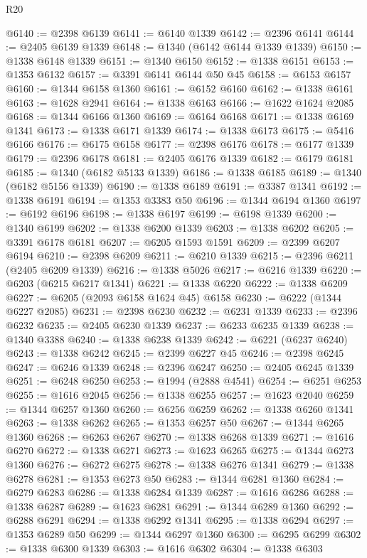 \begin{lexlean}{R20}
\begin{coremodule}
@6140 := @2398 @6139
@6141 := @6140 @1339
@6142 := @2396 @6141
@6144 := @2405 @6139 @1339
@6148 := @1340 (@6142 @6144 @1339 @1339)
@6150 := @1338 @6148 @1339
@6151 := @1340 @6150
@6152 := @1338 @6151
@6153 := @1353 @6132
@6157 := @3391 @6141 @6144 @50 @45
@6158 := @6153 @6157
@6160 := @1344 @6158 @1360
@6161 := @6152 @6160
@6162 := @1338 @6161
@6163 := @1628 @2941
@6164 := @1338 @6163
@6166 := @1622 @1624 @2085
@6168 := @1344 @6166 @1360
@6169 := @6164 @6168
@6171 := @1338 @6169 @1341
@6173 := @1338 @6171 @1339
@6174 := @1338 @6173
@6175 := @5416 @6166
@6176 := @6175 @6158
@6177 := @2398 @6176
@6178 := @6177 @1339
@6179 := @2396 @6178
@6181 := @2405 @6176 @1339
@6182 := @6179 @6181
@6185 := @1340 (@6182 @5133 @1339)
@6186 := @1338 @6185
@6189 := @1340 (@6182 @5156 @1339)
@6190 := @1338 @6189
@6191 := @3387 @1341
@6192 := @1338 @6191
@6194 := @1353 @3383 @50
@6196 := @1344 @6194 @1360
@6197 := @6192 @6196
@6198 := @1338 @6197
@6199 := @6198 @1339
@6200 := @1340 @6199
@6202 := @1338 @6200 @1339
@6203 := @1338 @6202
@6205 := @3391 @6178 @6181
@6207 := @6205 @1593 @1591
@6209 := @2399 @6207 @6194
@6210 := @2398 @6209
@6211 := @6210 @1339
@6215 := @2396 @6211 (@2405 @6209 @1339)
@6216 := @1338 @5026
@6217 := @6216 @1339
@6220 := @6203 (@6215 @6217 @1341)
@6221 := @1338 @6220
@6222 := @1338 @6209
@6227 := @6205 (@2093 @6158 @1624 @45) @6158
@6230 := @6222 (@1344 @6227 @2085)
@6231 := @2398 @6230
@6232 := @6231 @1339
@6233 := @2396 @6232
@6235 := @2405 @6230 @1339
@6237 := @6233 @6235 @1339
@6238 := @1340 @3388
@6240 := @1338 @6238 @1339
@6242 := @6221 (@6237 @6240)
@6243 := @1338 @6242
@6245 := @2399 @6227 @45
@6246 := @2398 @6245
@6247 := @6246 @1339
@6248 := @2396 @6247
@6250 := @2405 @6245 @1339
@6251 := @6248 @6250
@6253 := @1994 (@2888 @4541)
@6254 := @6251 @6253
@6255 := @1616 @2045
@6256 := @1338 @6255
@6257 := @1623 @2040
@6259 := @1344 @6257 @1360
@6260 := @6256 @6259
@6262 := @1338 @6260 @1341
@6263 := @1338 @6262
@6265 := @1353 @6257 @50
@6267 := @1344 @6265 @1360
@6268 := @6263 @6267
@6270 := @1338 @6268 @1339
@6271 := @1616 @6270
@6272 := @1338 @6271
@6273 := @1623 @6265
@6275 := @1344 @6273 @1360
@6276 := @6272 @6275
@6278 := @1338 @6276 @1341
@6279 := @1338 @6278
@6281 := @1353 @6273 @50
@6283 := @1344 @6281 @1360
@6284 := @6279 @6283
@6286 := @1338 @6284 @1339
@6287 := @1616 @6286
@6288 := @1338 @6287
@6289 := @1623 @6281
@6291 := @1344 @6289 @1360
@6292 := @6288 @6291
@6294 := @1338 @6292 @1341
@6295 := @1338 @6294
@6297 := @1353 @6289 @50
@6299 := @1344 @6297 @1360
@6300 := @6295 @6299
@6302 := @1338 @6300 @1339
@6303 := @1616 @6302
@6304 := @1338 @6303

\end{coremodule}
\end{lexlean}
